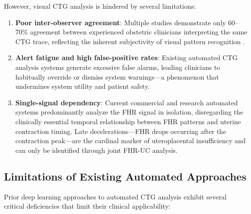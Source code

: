 \documentclass[conference]{IEEEtran}
\begin{document}
However, visual CTG analysis is hindered by several limitations:

\begin{enumerate}
    \item \textbf{Poor inter-observer agreement}: Multiple studies demonstrate
    only 60–70\% agreement between experienced obstetric clinicians interpreting
    the same CTG trace, reflecting the inherent subjectivity of visual
    pattern recognition \cite{bernardes1997}.

    \item \textbf{Alert fatigue and high false-positive rates}: Existing
    automated CTG analysis systems generate excessive false alarms, leading
    clinicians to habitually override or dismiss system warnings—a phenomenon
    that undermines system utility and patient safety.

    \item \textbf{Single-signal dependency}: Current commercial and research
    automated systems predominantly analyze the FHR signal in isolation,
    disregarding the clinically essential temporal relationship between FHR
    patterns and uterine contraction timing. Late decelerations—FHR drops
    occurring after the contraction peak—are the cardinal marker of
    uteroplacental insufficiency and can only be identified through joint
    FHR-UC analysis.
\end{enumerate}

\subsection{Limitations of Existing Automated Approaches}

Prior deep learning approaches to automated CTG analysis exhibit several
critical deficiencies that limit their clinical applicability:
\end{document}
